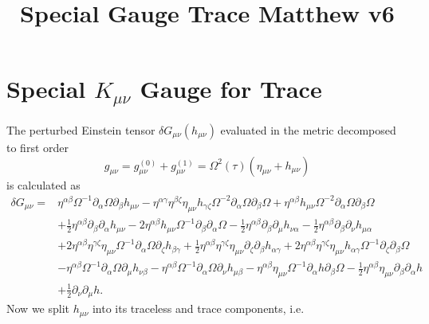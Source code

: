 \documentclass[10pt,letterpaper]{article}
\title{Special Gauge Trace Matthew v6}
\date{}
\begin{document}
\maketitle
\noindent

\section*{Special $K_{\mu\nu}$ Gauge for Trace}
The perturbed Einstein tensor $\delta  G_{\mu\nu}( h_{\mu\nu})$ evaluated in the metric decomposed to first order 
\begin{equation}
g_{\mu\nu} = g^{(0)}_{\mu\nu} + g^{(1)}_{\mu\nu} = \Omega^2(\tau)(\eta_{\mu\nu}+h_{\mu\nu})
\end{equation}
is calculated as 
\begin{align}
\delta G_{\mu\nu}={}&\eta^{\alpha \beta} \Omega^{-1} \partial_{\alpha}\Omega \partial_{\beta}h_{\mu \nu}
 -  \eta^{\alpha \gamma} \eta^{\beta \zeta} \eta_{\mu \nu} h_{\gamma \zeta} \Omega^{-2} \partial_{\alpha}\Omega \partial_{\beta}\Omega
 + \eta^{\alpha \beta} h_{\mu \nu} \Omega^{-2} \partial_{\alpha}\Omega \partial_{\beta}\Omega\nonumber\\
& + \tfrac{1}{2} \eta^{\alpha \beta} \partial_{\beta}\partial_{\alpha}h_{\mu \nu}
 - 2 \eta^{\alpha \beta} h_{\mu \nu} \Omega^{-1} \partial_{\beta}\partial_{\alpha}\Omega
 -  \tfrac{1}{2} \eta^{\alpha \beta} \partial_{\beta}\partial_{\mu}h_{\nu \alpha}
 -  \tfrac{1}{2} \eta^{\alpha \beta} \partial_{\beta}\partial_{\nu}h_{\mu \alpha}\nonumber\\
& + 2 \eta^{\alpha \beta} \eta^{\gamma \zeta} \eta_{\mu \nu} \Omega^{-1} \partial_{\alpha}\Omega \partial_{\zeta}h_{\beta \gamma}
 + \tfrac{1}{2} \eta^{\alpha \beta} \eta^{\gamma \zeta} \eta_{\mu \nu} \partial_{\zeta}\partial_{\beta}h_{\alpha \gamma}
 + 2 \eta^{\alpha \beta} \eta^{\gamma \zeta} \eta_{\mu \nu} h_{\alpha \gamma} \Omega^{-1} \partial_{\zeta}\partial_{\beta}\Omega\nonumber\\
& -  \eta^{\alpha \beta} \Omega^{-1} \partial_{\alpha}\Omega \partial_{\mu}h_{\nu \beta}
 -  \eta^{\alpha \beta} \Omega^{-1} \partial_{\alpha}\Omega \partial_{\nu}h_{\mu \beta}- \eta^{\alpha \beta} \eta_{\mu \nu} \Omega^{-1} \partial_{\alpha}h \partial_{\beta}\Omega -  \tfrac{1}{2} \eta^{\alpha \beta} \eta_{\mu \nu} \partial_{\beta}\partial_{\alpha}h\nonumber \\
& + \tfrac{1}{2} \partial_{\nu}\partial_{\mu}h.
\end{align}
Now we split $h_{\mu\nu}$ into its traceless and trace components, i.e.
\end{document}
